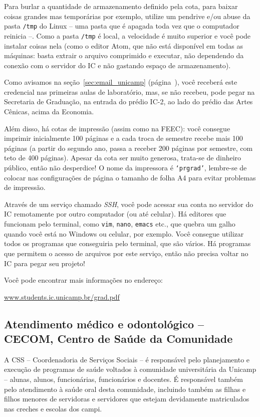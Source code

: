 Para burlar a quantidade de armazenamento definido pela cota, para baixar
coisas grandes mas temporárias por exemplo, utilize um pendrive e/ou abuse da
pasta \texttt{/tmp} do Linux -- uma pasta que é apagada toda vez que o
computador reinicia --. Como a pasta \texttt{/tmp} é local, a velocidade é
muito superior e você pode instalar coisas nela (como o editor Atom, que não
está disponível em todas as máquinas: basta extrair o arquivo comprimido e
executar, não dependendo da conexão com o servidor do IC e não gastando espaço
de armazenamento).

Como avisamos na seção~\ref{sec:email_unicamp}
(página~\pageref{sec:email_unicamp}), você receberá este credencial nas
primeiras aulas de laboratório, mas, se não recebeu, pode pegar na Secretaria
de Graduação, na entrada do prédio IC-2, ao lado do prédio das Artes Cênicas,
acima da Economia.

Além disso, há cotas de impressão (assim como na FEEC): você consegue imprimir
inicialmente 100 páginas e a cada troca de semestre recebe mais 100 páginas (a
partir do segundo ano, passa a receber 200 páginas por semestre, com teto de
400 páginas). Apesar da cota ser muito generosa, trata-se de dinheiro público,
então não desperdice! O nome da impressora é \texttt{`prgrad'}, lembre-se de
colocar nas configurações de página o tamanho de folha A4 para evitar problemas
de impressão.

Através de um serviço chamado \emph{SSH}, você pode acessar sua conta no
servidor do IC remotamente por outro computador (ou até celular). Há editores
que funcionam pelo terminal, como \texttt{vim}, \texttt{nano}, \texttt{emacs}
etc., que quebra um galho quando você está no Windows ou celular, por exemplo.
Você consegue utilizar todos os programas que conseguiria pelo terminal, que
são vários. Há programas que permitem o acesso de arquivos por este serviço,
então não precisa voltar no IC para pegar seu projeto!

Você pode encontrar mais informações no endereço:

\begin{center}
\url{www.students.ic.unicamp.br/grad.pdf}
\end{center}

\subsection{Atendimento médico e odontológico -- CECOM, Centro de Saúde da
Comunidade}

A CSS -- Coordenadoria de Serviços Sociais -- é responsável pelo planejamento e
execução de programas de saúde voltados à comunidade universitária da Unicamp
-- alunas, alunos, funcionárias, funcionários e docentes. É responsável também
pelo atendimento à saúde oral desta comunidade, incluindo também as filhas e
filhos menores de servidoras e servidores que estejam devidamente matriculados
nas creches e escolas dos campi.

